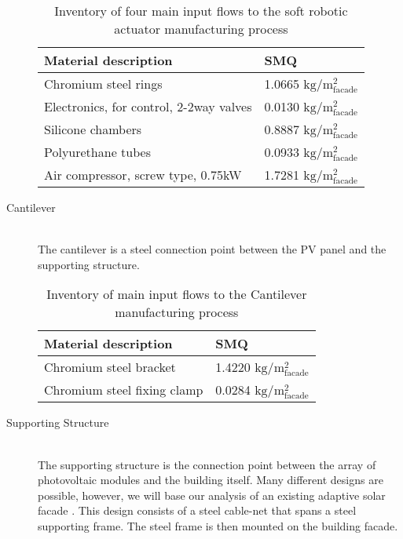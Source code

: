 \begin{description}
\begin{table}[H]
\centering
\begin{tabular}{ll}
\hline
Material description & SMQ \\ \hline
Chromium steel rings	 & 1.0665 ${\mathrm{kg/m^2_{facade}}}$ \\
Electronics, for control, 2-2way valves  & 0.0130  ${\mathrm{kg/m^2_{facade}}}$\\
Silicone chambers & 0.8887 ${\mathrm{kg/m^2_{facade}}}$\\
Polyurethane tubes &0.0933 ${\mathrm{kg/m^2_{facade}}}$\\
Air compressor, screw type, 0.75kW & 1.7281 ${\mathrm{kg/m^2_{facade}}}$\\
\hline
\end{tabular}
\caption{Inventory of four main input flows to the soft robotic actuator manufacturing process }
\label{tab:ActuatorInv}
\end{table}

\item[Cantilever] \hfill \\
The cantilever is a steel connection point between the PV panel and the supporting structure.\\

\begin{table}[H]
\centering
\begin{tabular}{ll}
\hline
Material description & SMQ \\ \hline
Chromium steel bracket	 & 1.4220 ${\mathrm{kg/m^2_{facade}}}$ \\
Chromium steel fixing clamp  & 0.0284 ${\mathrm{kg/m^2_{facade}}}$\\
\hline
\end{tabular}
\caption{Inventory of main input flows to the Cantilever manufacturing process }
\label{tab:CantileverInv}
\end{table}

\item[Supporting Structure] \hfill \\
The supporting structure is the connection point between the array of photovoltaic modules and the building itself. Many different designs are possible, however, we will base our analysis of an existing adaptive solar facade \cite{nagy2015frontiers}. This design consists of a steel cable-net that spans a steel supporting frame. The steel frame is then mounted on the building facade.\\


\end{description}
